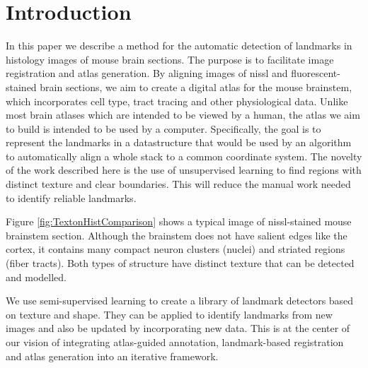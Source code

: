 \documentclass{llncs}
\begin{document}
\section{Introduction}

In this paper we describe a method for the automatic detection of
landmarks in histology images of mouse brain sections. The purpose is
to facilitate image registration and atlas generation. By aligning
images of nissl and fluorescent-stained brain sections, we aim to
create a digital atlas for the mouse brainstem, which incorporates
cell type, tract tracing and other physiological data. Unlike most
brain atlases which are intended to be viewed by a human, the atlas we
aim to build is intended to be used by a computer. Specifically, the
goal is to represent the landmarks in a datastructure that would be
used by an algorithm to automatically align a whole stack to a common
coordinate system.  The novelty of the work described here is the use
of unsupervised learning to find regions with distinct texture and
clear boundaries. This will reduce the manual work needed to identify
reliable landmarks.

Figure \ref{fig:TextonHistComparison} shows a typical image of nissl-stained mouse brainstem section. Although the brainstem does not have salient edges like the cortex, it contains many compact neuron clusters (nuclei) and striated regions (fiber tracts). Both types of structure have distinct texture that can be detected and modelled.

We use semi-supervised learning to create a library of landmark detectors based on texture and shape. They can be applied to identify landmarks from new images and also be updated by incorporating new data. This is at the center of our vision of integrating atlas-guided annotation, landmark-based registration and atlas generation into an iterative framework.



\end{document}
